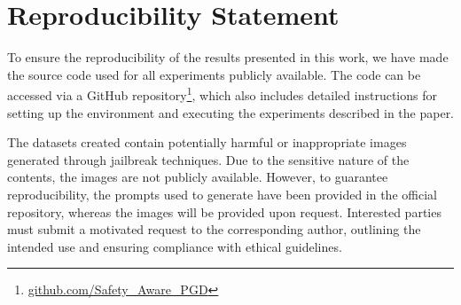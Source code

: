 \documentclass[acmsmall]{acmart}
\begin{document}
{\appendix
\vspace{-0.1cm}
\section{Reproducibility Statement}
To ensure the reproducibility of the results presented in this work, we have made the source code used for all experiments publicly available. The code can be accessed via a GitHub repository\footnote{\href{https://github.com/GSoli96/Safety_Aware_PGD.git}{github.com/Safety\_Aware\_PGD}}, which also includes detailed instructions for setting up the environment and executing the experiments described in the paper.

The datasets created contain potentially harmful or inappropriate images generated through jailbreak techniques. Due to the sensitive nature of the contents, the images are not publicly available. However, to guarantee reproducibility, the prompts used to generate have been provided in the official repository, whereas the images will be provided upon request. Interested parties must submit a motivated request to the corresponding author, outlining the intended use and ensuring compliance with ethical guidelines.



}
\end{document}
